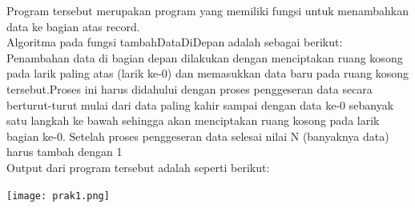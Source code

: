 \documentclass[a4paper,12pt]{article}
\begin{document}
Program tersebut merupakan program yang memiliki fungsi untuk menambahkan data ke bagian atas record.\\
Algoritma pada fungsi tambahDataDiDepan adalah sebagai berikut:\\
Penambahan data di bagian depan dilakukan dengan menciptakan ruang kosong pada  larik  paling  atas  (larik  ke-0)  dan
memasukkan  data  baru  pada  ruang  kosong tersebut.Proses  ini  harus  didahului  dengan  proses  penggeseran  data
secara  berturut-turut mulai dari data paling kahir sampai dengan data ke-0 sebanyak satu langkah ke bawah sehingga
akan menciptakan ruang kosong pada larik bagian ke-0. Setelah proses penggeseran data selesai nilai N (banyaknya data)
harus tambah dengan 1\\
Output dari program tersebut adalah seperti berikut:
\begin{center}
    \texttt{[image: prak1.png]} 
\end{center}
\end{document}
